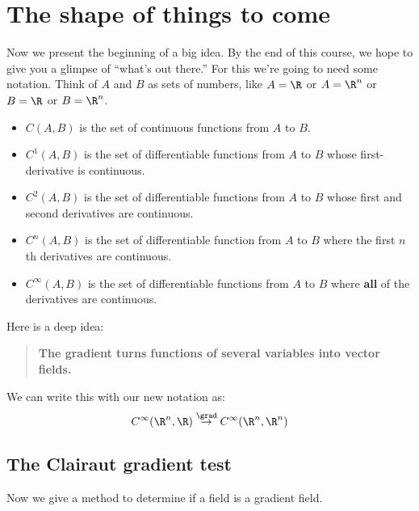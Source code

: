 \documentclass{ximera}
\begin{document}
\section{The shape of things to come}

Now we present the beginning of a big idea. By the end of this course,
we hope to give you a glimpse of ``what's out there.'' For this we're
going to need some notation. Think of $A$ and $B$ as sets of numbers,
like $A=\R$ or $A=\R^n$ or $B=\R$ or $B=\R^n$.

\begin{itemize}
\item $C(A,B)$ is the set of continuous functions from $A$ to $B$.
\item $C^1(A,B)$ is the set of  differentiable functions from $A$ to $B$ whose
  first-derivative is continuous.
\item $C^2(A,B)$ is the set of  differentiable functions from $A$ to $B$ whose
  first and second derivatives are continuous.
\item $C^n(A,B)$ is the set of differentiable function from $A$ to $B$
  where the first $n$th derivatives are continuous.
\item $C^\infty(A,B)$ is the set of differentiable functions from $A$
  to $B$ where \textbf{all} of the derivatives are continuous.
\end{itemize}
Here is a deep idea:
\begin{quote}
  \textbf{The gradient turns functions of several variables into vector fields.}
\end{quote}
We can write this with our new notation as: 
\[
C^\infty(\R^n,\R)\overset{\grad}{\to}C^\infty(\R^n,\R^n)
\]


\subsection{The Clairaut gradient test}


Now we give a method to determine if a field is a gradient field. 
\end{document}
